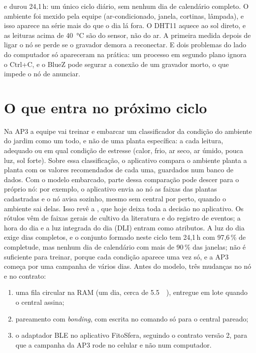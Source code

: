 \begin{itemize}
    e durou 24,1\,h: um único ciclo diário, sem nenhum dia de calendário
    completo. O ambiente foi mexido pela equipe (ar-condicionado, janela,
    cortinas, lâmpada), e isso aparece na série mais do que o dia lá fora.
    O DHT11 aquece ao sol direto, e as leituras acima de
    \SI{40}{\celsius} são do sensor, não do ar. A primeira medida depois de
    ligar o nó se perde se o gravador demora a reconectar. E dois
    problemas do lado do computador só apareceram na prática: um processo
    em segundo plano ignora o Ctrl+C, e o BlueZ pode segurar a conexão de
    um gravador morto, o que impede o nó de anunciar.
\end{itemize}

\section{O que entra no próximo ciclo}
\label{sec:proximo-ciclo}

Na AP3 a equipe vai treinar e embarcar um classificador da condição do
ambiente do jardim como um todo, e não de uma planta específica: a cada
leitura, adequado ou em qual condição de estresse (calor, frio, ar seco,
ar úmido, pouca luz, sol forte). Sobre essa classificação, o aplicativo
compara o ambiente planta a planta com os valores recomendados de cada
uma, guardados num banco de dados. Com o modelo embarcado, parte dessa
comparação pode descer para o próprio nó: por exemplo, o aplicativo
envia ao nó as faixas das plantas cadastradas e o nó avisa sozinho,
mesmo sem central por perto, quando o ambiente sai delas. Isso revê a
, que hoje deixa toda a decisão no aplicativo. Os rótulos vêm de faixas gerais de
cultivo da literatura e do registro de eventos; a hora do dia e a luz integrada do dia (DLI) entram
como atributos. A luz do dia exige dias completos, e o conjunto
formado neste ciclo tem 24,1\,h com 97,6\,\% de completude, mas nenhum
dia de calendário com mais de 90\,\% das janelas; não é suficiente para
treinar, porque cada condição aparece uma vez só, e a AP3 começa por uma
campanha de vários dias. Antes do modelo, três mudanças
no nó e no contrato:

\begin{enumerate}
  \item uma fila circular na RAM (um dia, cerca de \SI{5.5}{\kilo\byte}),
    entregue em lote quando o central assina;
  \item pareamento com \emph{bonding}, com escrita no comando só para o
    central pareado;
  \item o adaptador BLE no aplicativo FitoSfera, seguindo o contrato
    versão 2, para que a campanha da AP3 rode no celular e não num
    computador.
\end{enumerate}

